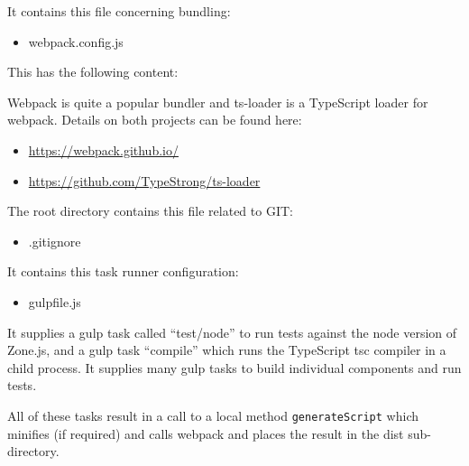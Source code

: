 It contains this file concerning bundling:

\begin{itemize}
  \item webpack.config.js
\end{itemize}

This has the following content:



Webpack is quite a popular bundler and ts-loader is a TypeScript loader for webpack.
Details on both projects can be found here:

\begin{itemize}
  \item \url{https://webpack.github.io/}
  \item \url{https://github.com/TypeStrong/ts-loader}
\end{itemize}

The root directory contains this file related to GIT:

\begin{itemize}
  \item .gitignore
\end{itemize}

It contains this task runner configuration:

\begin{itemize}
  \item gulpfile.js
\end{itemize}

It supplies a gulp task called “test/node” to run tests against the node version of
Zone.js, and a gulp task “compile” which runs the TypeScript tsc compiler in a child
process. It supplies many gulp tasks to build individual components and run tests.

All of these tasks result in a call to a local method
\texttt{generateScript}
which minifies (if
required) and calls webpack and places the result in the dist sub-directory.
